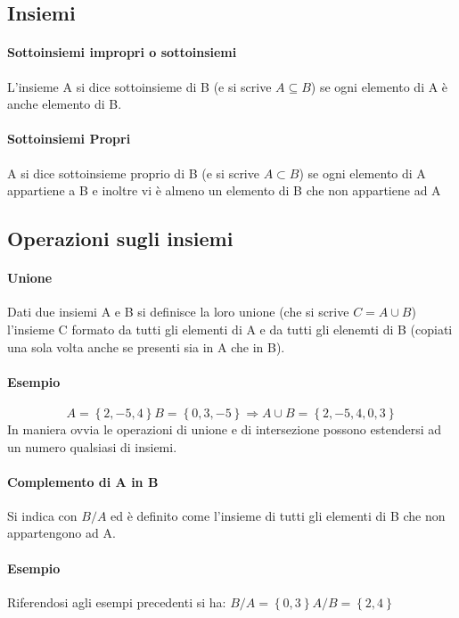 \subsection{Insiemi}

\paragraph{Sottoinsiemi impropri o sottoinsiemi}
 L'insieme A si dice sottoinsieme di B (e si scrive $A\subseteq B$) se ogni elemento di A è anche elemento di B.
 
\paragraph{Sottoinsiemi Propri}
 A si dice sottoinsieme proprio di B (e si scrive $A \subset B$) se ogni elemento di A appartiene a B e inoltre vi è almeno un elemento di B che non appartiene ad A\\

 \subsection{Operazioni sugli insiemi}

 \paragraph{Unione}
 Dati due insiemi A e B si definisce la loro unione (che si scrive $C=A \cup B$) l'insieme C formato da tutti gli elementi di A e da tutti gli elenemti di B (copiati una sola volta anche se presenti sia in A che in B).

 \paragraph{Esempio}
  \[
   A=\left\{{2,-5,4}\right\} B=\left\{{0,3,-5}\right\}\Rightarrow A\cup B=\left\{{2,-5,4,0,3}\right\}
  \]
  In maniera ovvia le operazioni di unione e di intersezione possono estendersi ad un numero qualsiasi di insiemi.

 \paragraph{Complemento di A in B}
  Si indica con $B/A$ ed è definito come l'insieme di tutti gli elementi di B che non appartengono ad A.

  \paragraph{Esempio}
  Riferendosi agli esempi precedenti si ha:
  \begin{math}
  B/A=\left\{{0,3}\right\}
  A/B=\left\{{2,4}\right\}
  \end{math}

